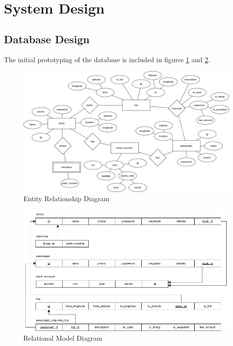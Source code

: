 \documentclass{BusMateSRS}
\begin{document}
\section{System Design}

\subsection{Database Design}

The initial prototyping of the database is included in figures
\ref{fig:entity-relationship-diagram} and 
\ref{fig:relational-model}.

\begin{figure}[ht!]
	\begin{center}
		\includegraphics[width=\columnwidth]{drawings/entity-relationship-diagram.drawio.png}
	\end{center}
	\caption{Entity Relationship Diagram}
	\label{fig:entity-relationship-diagram}
\end{figure}

\begin{figure}[ht!]
	\begin{center}
		\includegraphics[width=\columnwidth]{drawings/relational-model.drawio.png}
	\end{center}
	\caption{Relational Model Diagram}
	\label{fig:relational-model}
\end{figure}
\end{document}
